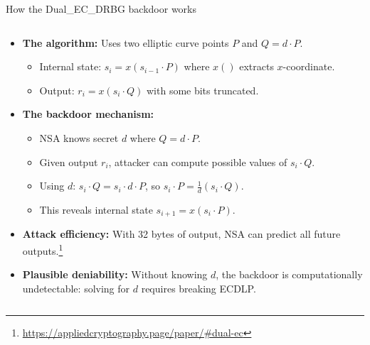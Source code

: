 \documentclass[aspectratio=169, lualatex, handout]{beamer}
\begin{document}
\begin{frame}{How the Dual\_EC\_DRBG backdoor works}
	\begin{columns}[c]
		\begin{column}{1\textwidth}
			\begin{itemize}
				\item \textbf{The algorithm:} Uses two elliptic curve points $P$ and $Q = d \cdot P$.
				      \begin{itemize}
					      \item Internal state: $s_i = x(s_{i-1} \cdot P)$ where $x()$ extracts $x$-coordinate.
					      \item Output: $r_i = x(s_i \cdot Q)$ with some bits truncated.
				      \end{itemize}
				\item \textbf{The backdoor mechanism:}
				      \begin{itemize}
					      \item NSA knows secret $d$ where $Q = d \cdot P$.
					      \item Given output $r_i$, attacker can compute possible values of $s_i \cdot Q$.
					      \item Using $d$: $s_i \cdot Q = s_i \cdot d \cdot P$, so $s_i \cdot P = \frac{1}{d}(s_i \cdot Q)$.
					      \item This reveals internal state $s_{i+1} = x(s_i \cdot P)$.
				      \end{itemize}
				\item \textbf{Attack efficiency:} With 32 bytes of output, NSA can predict all future outputs.\footnote{\url{https://appliedcryptography.page/paper/\#dual-ec}}
				\item \textbf{Plausible deniability:} Without knowing $d$, the backdoor is computationally undetectable: solving for $d$ requires breaking ECDLP.
			\end{itemize}
		\end{column}
	\end{columns}
\end{frame}
\end{document}
